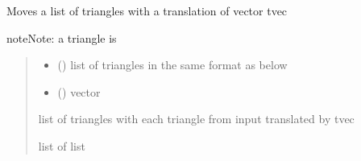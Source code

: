 \documentclass[letterpaper,10pt,english]{sphinxmanual}
\begin{document}
\begin{fulllineitems}
\end{fulllineitems}


\begin{fulllineitems}
\label{\detokenize{reference:basicgeometry.translate}}
\pysigstartsignatures
{}
\pysigstopsignatures
\sphinxAtStartPar
Moves a list of triangles with a translation of vector tvec

\begin{sphinxadmonition}{note}{Note:}
\sphinxAtStartPar
a triangle is \sphinxcode{\sphinxupquote{{[}(x1,y1,z1),(x2,y2,z2),(x3,y3,z3){]}}}
\end{sphinxadmonition}
\begin{quote}\begin{description}
\begin{itemize}
\item {} 
\sphinxAtStartPar
{} () \textendash{} list of triangles in the same format as below

\item {} 
\sphinxAtStartPar
{} () \textendash{} vector

\end{itemize}

\sphinxAtStartPar
list of triangles with each triangle from input translated by tvec

\sphinxAtStartPar
list of list

\end{description}\end{quote}



\end{fulllineitems}
\end{document}
